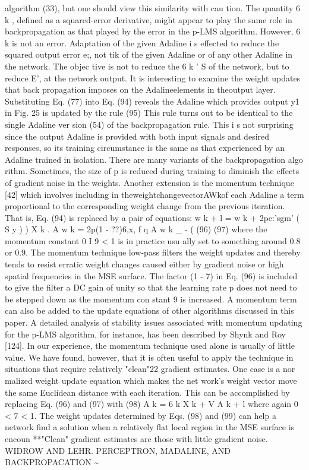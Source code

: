 \documentclass[11pt,a4paper,twocolumn]{article}
\begin{document}
{{algorithm (33), but one should view this similarity with cau
tion. The quantity 6 k ,  defined as a squared-error derivative, 
might appear to play the same role in backpropagation as 
that played by the error in the p-LMS algorithm. However, 
6 k  is not an error. Adaptation of the given Adaline i s  effected 
to reduce the squared output error e;, not tik of the given 
Adaline or of any other Adaline in the network. The objec
tive is not to reduce the 6 k ' S  of the network, but to reduce 
E', at the network output. 
It is interesting to examine the weight updates that back
propagation imposes on the Adalineelements in theoutput 
layer. Substituting Eq. (77) into Eq. (94) reveals the Adaline 
which provides output y1 in Fig. 25 is updated by the rule 
(95) 
This rule turns out to be identical to the single Adaline ver
sion (54) of the backpropagation rule. This i s  not surprising 
since the output Adaline is provided with both input signals 
and desired responses, so its training circumstance is the 
same as that experienced by an Adaline trained in isolation. 
There are many variants of the backpropagation algo
rithm. Sometimes, the size of p is reduced during training 
to diminish the effects of gradient noise in the weights. 
Another extension is the momentum technique [42] which 
involves including in theweightchangevectorAWkof each 
Adaline a term proportional to the corresponding weight 
change from the previous iteration. That is, Eq. (94) is 
replaced by a pair of equations: 
w k + l  = w k  + 2pe:'sgm' 
( S y ) ) X k .  
A w k  = 2p(1 - ??)6,x, f q A w k \_ - (  
(96) 
(97) 
where the momentum constant 0 I 
9 < 1 is in practice usu
ally set to something around 0.8 or 0.9. 
The momentum technique low-pass filters the weight 
updates and thereby tends to resist erratic weight changes 
caused either by gradient noise or high spatial frequencies 
in the MSE surface. The factor (1 - 7) in Eq. (96) is included 
to give the filter a DC gain of unity so that the learning rate 
p does not need to be stepped down as the momentum con
stant 9 is increased. A momentum term can also be added 
to the update equations of other algorithms discussed in 
this paper. A detailed analysis of stability issues associated 
with momentum updating for the p-LMS algorithm, for 
instance, has been described by Shynk and Roy [124]. 
In our experience, the momentum technique used alone 
is usually of little value. We have found, however, that it is 
often useful to apply the technique in situations that require 
relatively "clean"22 gradient estimates. One case is a nor
malized weight update equation which makes the net
work's weight vector move the same Euclidean distance 
with each iteration. This can be accomplished by replacing 
Eq. (96) and (97) with 
(98) 
A k  = 6 k X k  + V A k + l  
where again 0 < 7 < 1. The weight updates determined by 
Eqs. (98) and (99) can help a network find a solution when 
a relatively flat local region in the MSE surface is encoun
**"Clean" gradient estimates are those with little gradient noise. 
WIDROW AND LEHR. PERCEPTRON, MADALINE, AND BACKPROPACATION 
\~{} 




}}
\end{document}
